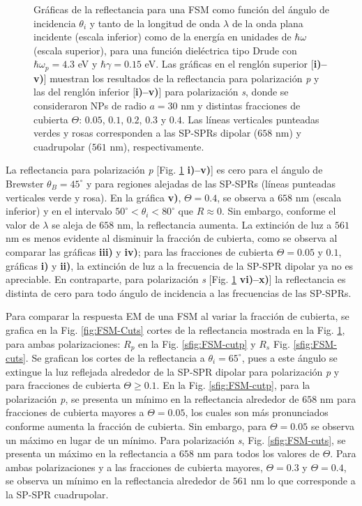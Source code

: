 \begin{figure}[h!]
\begin{tikzpicture}[scale=1]
\end{tikzpicture}\vspace*{-.75em}
	\caption{Gráficas de la reflectancia para una FSM como función del ángulo de incidencia $\theta_i$ y tanto de la longitud de onda $\lambda$ de la onda plana incidente (escala inferior) como de la energía en  unidades de $\hbar\omega$ (escala superior), para una función dieléctrica tipo Drude con $\hbar\omega_p=4. 3$ eV  y  $\hbar\gamma=0. 15$ eV.  Las gráficas   en el renglón superior [\textbf{i)--v)}]  muestran los resultados de la reflectancia para  polarización \emph{p} y las del renglón inferior  [\textbf{i)--v)}] para polarización  \emph{s}, donde se consideraron NPs de radio $a=30$ nm y distintas fracciones de cubierta $\Theta$: $0. 05$, $0. 1$, $0. 2$, $0. 3$ y $0. 4$. Las líneas verticales punteadas verdes y rosas corresponden a las SP-SPRs dipolar ($658$ nm) y cuadrupolar ($561$ nm), respectivamente.}	\label{fig:R-FSM}	
	\end{figure}		
					
La reflectancia para polarización \emph{p} [Fig. \ref{fig:R-FSM} \textbf{i)--v)}] es cero para el ángulo de Brewster $\theta_B = 45^\circ$ y para regiones alejadas de las SP-SPRs (líneas punteadas verticales verde y rosa). En la gráfica \textbf{v)}, $\Theta=0.4$,  se observa a $658$ nm (escala inferior) y en el intervalo $50^\circ<\theta_i<80^\circ$ que $R\approx 0$. Sin embargo, conforme el valor de $\lambda$ se aleja de $658$ nm, la reflectancia aumenta. La extinción de luz a $561$ nm  es menos evidente al disminuir la fracción de cubierta, como se observa al comparar las gráficas \textbf{iii)} y \textbf{iv)}; para las fracciones de cubierta $\Theta=0.05$ y $0.1$, gráficas \textbf{i)} y \textbf{ii)}, la extinción de luz a la frecuencia de la SP-SPR dipolar  ya no es apreciable. En contraparte, para polarización \emph{s} [Fig. \ref{fig:R-FSM} \textbf{vi)--x)}] la reflectancia es distinta de cero para todo ángulo de incidencia a las frecuencias de las SP-SPRs. 

Para comparar la respuesta EM de una FSM al variar la fracción de cubierta, se grafica en la Fig. \ref{fig:FSM-Cuts} cortes de la reflectancia mostrada en la Fig. \ref{fig:R-FSM}, para ambas polarizaciones: $R_p$ en la Fig. \ref{sfig:FSM-cutp} y  $R_s$ Fig. \ref{sfig:FSM-cuts}. Se grafican los cortes de la reflectancia a $\theta_i = 65^\circ$, pues a este ángulo se extingue la luz reflejada alrededor de la SP-SPR dipolar para polarización \emph{p} y para fracciones de cubierta $\Theta\geq 0.1$. En la Fig. \ref{sfig:FSM-cutp}, para la polarización \emph{p}, se presenta un mínimo en la reflectancia alrededor de $658$ nm para fracciones de cubierta mayores a $\Theta = 0.05$, los cuales son más pronunciados conforme aumenta la fracción de cubierta. Sin embargo, para $\Theta=0.05$ se observa un máximo en lugar de un mínimo. Para polarización \emph{s}, Fig. \ref{sfig:FSM-cuts}, se presenta un máximo en la reflectancia a $658$ nm para todos los valores de $\Theta$. Para ambas polarizaciones y a las fracciones de cubierta mayores, $\Theta = 0.3$ y $\Theta = 0.4$,  se observa un  mínimo en la reflectancia alrededor de $561$ nm  lo que corresponde a la SP-SPR cuadrupolar.

